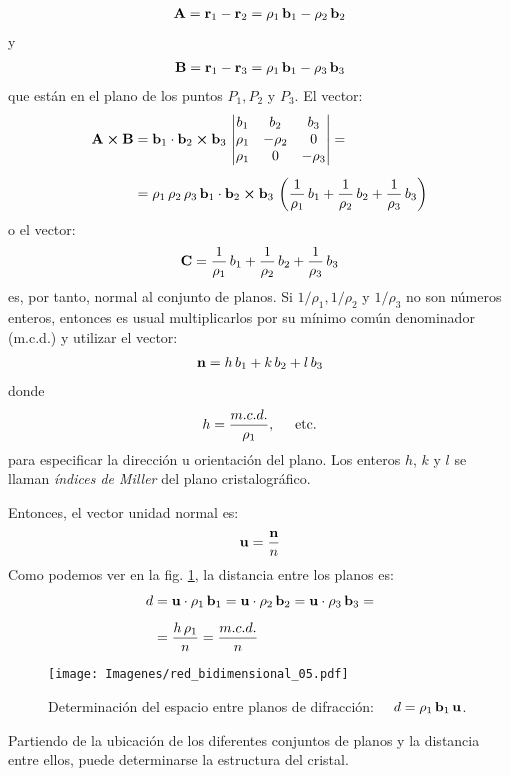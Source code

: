 \documentclass[12pt]{article}
\begin{document}
\begin{align*}
    \vb{A} = \vb{r}_{1} - \vb{r}_{2} = \rho_{1} \, \vb{b}_{1} - \rho_{2} \, \vb{b}_{2}
\end{align*}
y
\begin{align*}
    \vb{B} = \vb{r}_{1} - \vb{r}_{3} = \rho_{1} \, \vb{b}_{1} - \rho_{3} \, \vb{b}_{3}
\end{align*}
que están en el plano de los puntos $P_{1}, P_{2}$ y $P_{3}$. El vector:
\begin{align*}
    \vb{A} \cp \vb{B} &= \vb{b}_{1} \cdot \vb{b}_{2} \cp \vb{b}_{3} \, \mdet{
        b_{1} & b_{2} & b_{3} \\
        \rho_{1} & -\rho_{2} & 0 \\
        \rho_{1} & 0 & -\rho_{3}
    } = \\[0.5em]
    &= \rho_{1} \, \rho_{2} \, \rho_{3} \, \vb{b}_{1} \cdot \vb{b}_{2} \cp \vb{b}_{3} \, \left( \dfrac{1}{\rho_{1}} \, b_{1} + \dfrac{1}{\rho_{2}} \, b_{2} + \dfrac{1}{\rho_{3}} \, b_{3} \right)
\end{align*}
o el vector:
\begin{align*}
    \vb{C} = \dfrac{1}{\rho_{1}} \, b_{1} + \dfrac{1}{\rho_{2}} \, b_{2} + \dfrac{1}{\rho_{3}} \, b_{3}
\end{align*}
es, por tanto, normal al conjunto de planos. Si $1/\rho_{1}, 1/\rho_{2}$ y $1/\rho_{3}$ no son números enteros, entonces es usual multiplicarlos por su mínimo común denominador (m.c.d.) y utilizar el vector:
\begin{align*}
    \vb{n} = h \, b_{1} + k \, b_{2} + l \, b_{3}
\end{align*}
donde
\begin{align*}
    h = \dfrac{m.c.d.}{\rho_{1}}, \hspace{0.5cm} \text{etc.}
\end{align*}
para especificar la dirección u orientación del plano. Los enteros $h$, $k$ y $l$ se llaman \emph{índices de Miller} del plano cristalográfico.
\par
Entonces, el vector unidad normal es:
\begin{align*}
    \vb{u} = \dfrac{\vb{n}}{n}
\end{align*}
Como podemos ver en la fig. \ref{fig:figura_01_18}, la distancia entre los planos es:
\begin{align*}
d &= \vb{u} \cdot \rho_{1} \, \vb{b}_{1} = \vb{u} \cdot \rho_{2} \, \vb{b}_{2} = \vb{u} \cdot \rho_{3} \, \vb{b}_{3} = \\[0.5em]
&= \dfrac{h \, \rho_{1}}{n} = \dfrac{m.c.d.}{n}
\end{align*}
\begin{figure}[H]
    \centering
    \texttt{[image: Imagenes/red\_bidimensional\_05.pdf]}
    \caption{Determinación del espacio entre planos de difracción: \, \, $d = \rho_{1} \, \vb{b}_{1} \, \vb{u}$.}
    \label{fig:figura_01_18}
\end{figure}
Partiendo de la ubicación de los diferentes conjuntos de planos y la distancia entre ellos, puede determinarse la estructura del cristal.
\end{document}
